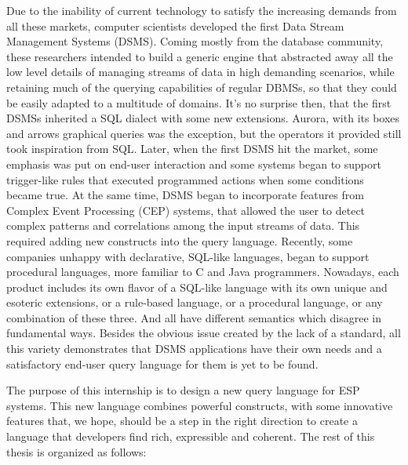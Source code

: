 \documentclass{report}
\begin{document}
Due to the inability of current technology to satisfy the increasing demands from all these markets, computer scientists developed the first Data Stream Management Systems (DSMS). Coming mostly from the database community, these researchers intended to build a generic engine that abstracted away all the low level details of managing streams of data in high demanding scenarios, while retaining much of the querying capabilities of regular DBMSs, so that they could be easily adapted to a multitude of domains. It's no surprise then, that the first DSMSs inherited a SQL dialect with some new extensions. Aurora, with its boxes and arrows graphical queries was the exception, but the operators it provided still took inspiration from SQL. Later, when the first DSMS hit the market, some emphasis was put on end-user interaction and some systems began to support trigger-like rules that executed programmed actions when some conditions became true. At the same time, DSMS began to incorporate features from Complex Event Processing (CEP) systems, that allowed the user to detect complex patterns and correlations among the input streams of data. This required adding new constructs into the query language. Recently, some companies unhappy with declarative, SQL-like languages, began to support procedural languages, more familiar to C and Java programmers. Nowadays, each product includes its own flavor of a SQL-like language with its own unique and esoteric extensions, or a rule-based language, or a procedural language, or any combination of these three. And all have different semantics which disagree in fundamental ways. Besides the obvious issue created by the lack of a standard, all this variety demonstrates that DSMS applications have their own needs and a satisfactory end-user query language for them is yet to be found.

The purpose of this internship is to design a new query language for ESP systems. This new language combines powerful constructs, with some innovative features that, we hope, should be a step in the right direction to create a language that developers find rich, expressible and coherent. The rest of this thesis is organized as follows:
\end{document}
